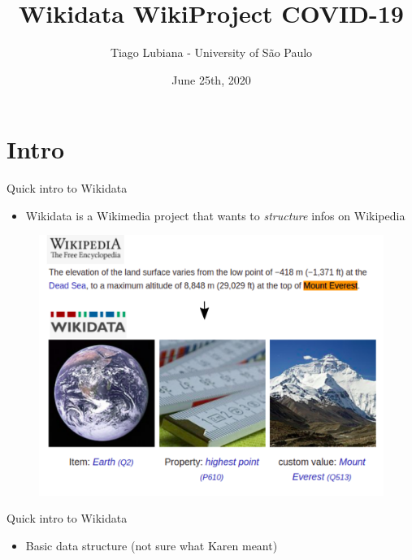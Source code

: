 \documentclass{beamer}
\title[Wikidata WikiProject COVID-19]{Wikidata WikiProject COVID-19}
\author[User:TiagoLubiana]{Tiago Lubiana - University of São Paulo}
\date[25/06/2020]{June 25th, 2020}
\begin{document}
\begin{frame}
  \titlepage
\end{frame}



\section{Intro}

\begin{frame}{Quick intro to Wikidata}

\begin{itemize}
    \item Wikidata is a Wikimedia project that wants to \textit{structure} infos on Wikipedia
\end{itemize}

\begin{figure}
\includegraphics[scale=0.45]{fig/intro wikidata.png}
\end{figure}

\end{frame}


\begin{frame}{Quick intro to Wikidata}

\begin{itemize}
    \item Basic data structure (not sure what Karen meant) 
\end{itemize}

\end{frame}
\end{document}
